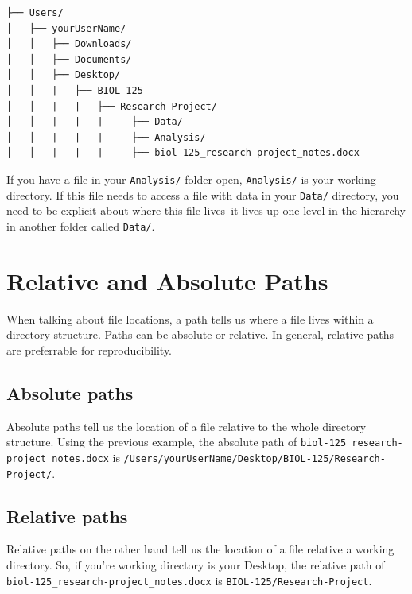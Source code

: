 \documentclass[
]{book}
\begin{document}
\begin{verbatim}
├── Users/
│   ├── yourUserName/
│   │   ├── Downloads/
│   │   ├── Documents/
│   │   ├── Desktop/
│   │   |   ├── BIOL-125
│   │   |   |   ├── Research-Project/
│   │   |   |   |     ├── Data/
│   │   |   |   |     ├── Analysis/
│   │   |   |   |     ├── biol-125_research-project_notes.docx
\end{verbatim}

If you have a file in your \texttt{Analysis/} folder open, \texttt{Analysis/} is your working directory. If this file needs to access a file with data in your \texttt{Data/} directory, you need to be explicit about where this file lives--it lives up one level in the hierarchy in another folder called \texttt{Data/}.

\hypertarget{relative-and-absolute-paths}{%
\section{Relative and Absolute Paths}\label{relative-and-absolute-paths}}

When talking about file locations, a path tells us where a file lives within a directory structure. Paths can be absolute or relative. In general, relative paths are preferrable for reproducibility.

\hypertarget{absolute-paths}{%
\subsection*{Absolute paths}\label{absolute-paths}}

Absolute paths tell us the location of a file relative to the whole directory structure. Using the previous example, the absolute path of \texttt{biol-125\_research-project\_notes.docx} is \texttt{/Users/yourUserName/Desktop/BIOL-125/Research-Project/}.

\hypertarget{relative-paths}{%
\subsection*{Relative paths}\label{relative-paths}}

Relative paths on the other hand tell us the location of a file relative a working directory. So, if you're working directory is your Desktop, the relative path of \texttt{biol-125\_research-project\_notes.docx} is \texttt{BIOL-125/Research-Project}.
\end{document}
